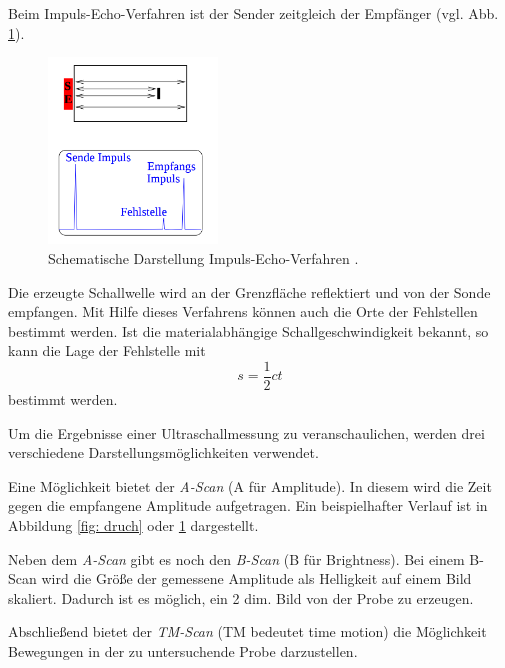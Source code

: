Beim Impuls-Echo-Verfahren ist der Sender zeitgleich der Empfänger (vgl. Abb. \ref{fig: echo}).
\begin{figure}[h]
  \centering
  \includegraphics[width=0.4\textwidth]{pics/impuls_echo.png}
  \caption{Schematische Darstellung Impuls-Echo-Verfahren \cite{anleitungus1}.}
  \label{fig: echo}
  \end{figure}
Die erzeugte Schallwelle wird an der Grenzfläche reflektiert und von der Sonde %
empfangen. Mit Hilfe dieses Verfahrens können auch die Orte der Fehlstellen bestimmt
werden. Ist die materialabhängige Schallgeschwindigkeit bekannt, so kann die
Lage der Fehlstelle mit
\begin{equation}
  \label{eq:lage_fehl}
  s=\frac{1}{2}ct
\end{equation}
bestimmt werden.

Um die Ergebnisse einer Ultraschallmessung zu veranschaulichen, werden drei verschiedene
Darstellungsmöglichkeiten verwendet.

Eine Möglichkeit bietet der \emph{A-Scan} (A für Amplitude). In diesem %
wird die Zeit gegen die empfangene Amplitude aufgetragen.
Ein beispielhafter Verlauf ist in Abbildung \ref{fig: druch} oder \ref{fig: echo}
dargestellt.

Neben dem \emph{A-Scan} gibt es noch den \emph{B-Scan} (B für Brightness).
Bei einem B-Scan wird die Größe der gemessene Amplitude als Helligkeit
auf einem Bild skaliert. Dadurch ist es möglich, ein 2 dim. Bild von der Probe zu erzeugen.

Abschließend bietet der \emph{TM-Scan} (TM bedeutet time motion) die Möglichkeit
Bewegungen in der zu untersuchende Probe darzustellen.
